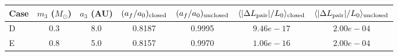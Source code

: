\begin{tabular}{@{}lcccccc@{}}
Case & $m_3$ ($M_\odot$) & $a_3$ (AU) & $(a_f/a_0)_{\rm closed}$ & $(a_f/a_0)_{\rm unclosed}$ & $\langle |\Delta L_{\rm pair}|/L_0 \rangle_{\rm closed}$ & $\langle |\Delta L_{\rm pair}|/L_0 \rangle_{\rm unclosed}$ \\
\midrule
D & 0.3 & 8.0 & 0.8187 & 0.9995 & $9.46e-17$ & $2.00e-04$ \\
E & 0.8 & 5.0 & 0.8157 & 0.9970 & $1.06e-16$ & $2.00e-04$ \\
\end{tabular}

